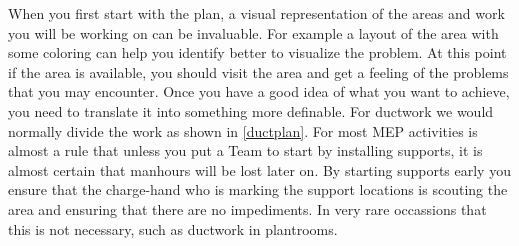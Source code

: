 When you first start with the plan, a visual representation of the
areas and work you will be working on can be invaluable. For example
a layout of the area with some coloring can help you identify better
to visualize the problem. At this point if the area is available, you
should visit the area and get a feeling of the problems that you may 
encounter. Once you have a good idea of what you want to achieve, you need to translate
it into something more definable. For ductwork we would normally divide
the work as shown in \ref{ductplan}. For most MEP activities is almost
a rule that unless you put a Team to start by installing supports, it is 
almost certain that manhours will be lost later on. By starting supports early
you ensure that the charge-hand who is marking the support locations is
scouting the area and ensuring that there are no impediments. In very rare
occassions that this is not necessary, such as ductwork in plantrooms.

